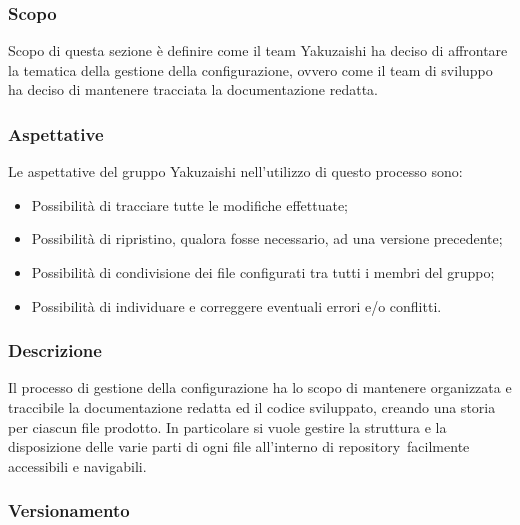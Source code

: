     \subsubsection{Scopo}
    Scopo di questa sezione è definire come il team Yakuzaishi ha deciso di affrontare la tematica della gestione della configurazione, ovvero come il team di sviluppo ha deciso di mantenere tracciata la documentazione redatta.

    \subsubsection{Aspettative}
    Le aspettative del gruppo Yakuzaishi nell'utilizzo di questo processo sono:
    \begin{itemize}
        \item Possibilità di tracciare tutte le modifiche effettuate;
        \item Possibilità di ripristino, qualora fosse necessario, ad una versione precedente;
        \item Possibilità di condivisione dei file configurati tra tutti i membri del gruppo;
        \item Possibilità di individuare e correggere eventuali errori e/o conflitti.
    \end{itemize}

    \subsubsection{Descrizione}
    Il processo di gestione della configurazione ha lo scopo di mantenere organizzata e traccibile la documentazione redatta ed il codice sviluppato, creando una storia per ciascun file prodotto.
    In particolare si vuole gestire la struttura e la disposizione delle varie parti di ogni file all'interno di repository\glo\ facilmente accessibili e navigabili.

    \subsubsection{Versionamento}
